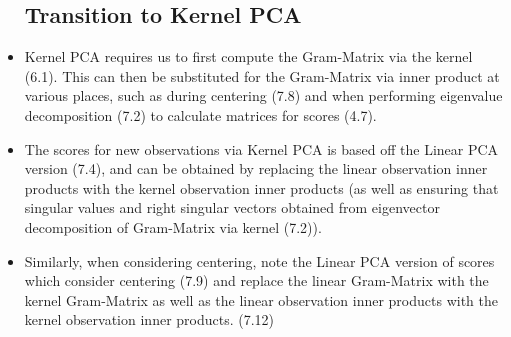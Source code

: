 \documentclass[english]{latex4ei/latex4ei_sheet}
\begin{document}
\begin{sectionbox}
\begin{itemize}
\subsection{Transition to Kernel PCA}
\item Kernel PCA requires us to first compute the Gram-Matrix via the kernel (6.1). This can then be substituted for the Gram-Matrix via inner product at various places, such as during centering (7.8) and when performing eigenvalue decomposition (7.2) to calculate matrices for scores (4.7).
\item The scores for new observations via Kernel PCA is based off the Linear PCA version (7.4), and can be obtained by replacing the linear observation inner products with the kernel observation inner products (as well as ensuring that singular values and right singular vectors obtained from eigenvector decomposition of Gram-Matrix via kernel (7.2)).
\item Similarly, when considering centering, note the Linear PCA version of scores which consider centering (7.9) and replace the linear Gram-Matrix with the kernel Gram-Matrix as well as the linear observation inner products with the kernel observation inner products. (7.12)
\end{itemize}
\end{sectionbox}
\end{document}
